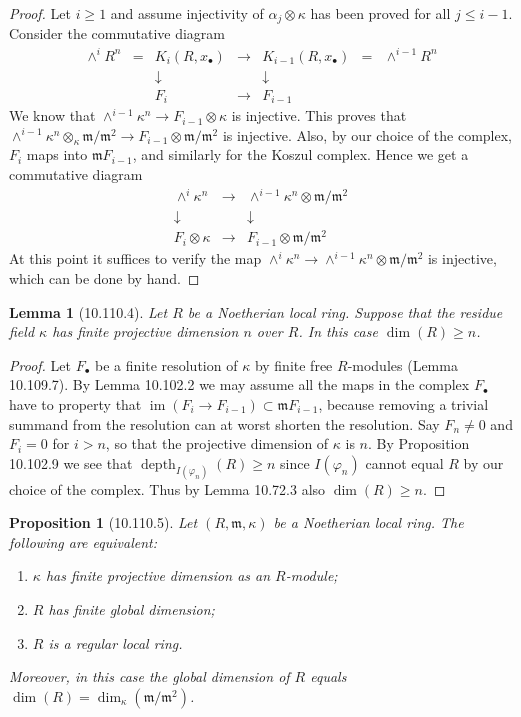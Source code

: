 \documentclass[UTF8,11pt]{ctexart}
\newtheorem*{lemma}{Lemma}
\newtheorem*{proposition}{Proposition}
\theoremstyle{definition}
\DeclareMathOperator{\im}{im}
\begin{document}
\begin{proof}
Let $i\geq1$ and assume injectivity of $\alpha_j\otimes\kappa$ has been proved for all $j\leq i-1$. Consider the commutative diagram
\[
\begin{matrix}
\wedge^iR^n&=&K_i(R,x_\bullet)&\to&K_{i-1}(R,x_\bullet)&=&\wedge^{i-1}R^n\\
&&\downarrow&&\downarrow&&\\
&&F_i&\to&F_{i-1}&&
\end{matrix}
\]
We know that $\wedge^{i-1}\kappa^n\to F_{i-1}\otimes\kappa$ is injective. This proves that $\wedge^{i-1}\kappa^n\otimes_\kappa\mathfrak m/\mathfrak m^2\to F_{i-1}\otimes\mathfrak m/\mathfrak m^2$ is injective. Also, by our choice of the complex, $F_i$ maps into $\mathfrak mF_{i-1}$, and similarly for the Koszul complex. Hence we get a commutative diagram
\[
\begin{matrix}
\wedge^i\kappa^n&\to&\wedge^{i-1}\kappa^n\otimes\mathfrak m/\mathfrak m^2\\
\downarrow&&\downarrow\\
F_i\otimes\kappa&\to&F_{i-1}\otimes\mathfrak m/\mathfrak m^2
\end{matrix}
\]
At this point it suffices to verify the map $\wedge^i\kappa^n\to\wedge^{i-1}\kappa^n\otimes\mathfrak m/\mathfrak m^2$ is injective, which can be done by hand.
\end{proof}
\begin{lemma}[10.110.4]
Let $R$ be a Noetherian local ring. Suppose that the residue field $\kappa$ has finite projective dimension $n$ over $R$. In this case $\dim(R)\geq n$.
\end{lemma}
\begin{proof}
Let $F_\bullet$ be a finite resolution of $\kappa$ by finite free $R$-modules (Lemma 10.109.7). By Lemma 10.102.2 we may assume all the maps in the complex $F_\bullet$ have to property that $\im(F_i\to F_{i-1})\subset\mathfrak mF_{i-1}$, because removing a trivial summand from the resolution can at worst shorten the resolution. Say $F_n\ne0$ and $F_i=0$ for $i>n$, so that the projective dimension of $\kappa$ is $n$. By Proposition 10.102.9 we see that $\operatorname{depth}_{I(\varphi_n)}(R)\geq n$ since $I(\varphi_n)$ cannot equal $R$ by our choice of the complex. Thus by Lemma 10.72.3 also $\dim(R)\geq n$.
\end{proof}
\begin{proposition}[10.110.5]
Let $(R,\mathfrak m,\kappa)$ be a Noetherian local ring. The following are equivalent:
\begin{enumerate}
\item $\kappa$ has finite projective dimension as an $R$-module;
\item $R$ has finite global dimension;
\item $R$ is a regular local ring.
\end{enumerate}
Moreover, in this case the global dimension of $R$ equals $\dim(R)=\dim_\kappa(\mathfrak m/\mathfrak m^2)$.
\end{proposition}
\end{document}
